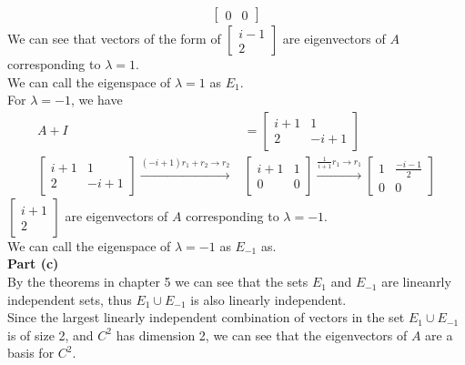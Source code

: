 \documentclass[answers,12pt,addpoints]{exam}
\begin{document}
\begin{questions}
\begin{solution}
\begin{align*}
\begin{bmatrix}
                0 & 0
            \end{bmatrix}
        \end{align*}
        We can see that vectors of the form of $\begin{bmatrix}
            i-1\\
            2
        \end{bmatrix}$ are eigenvectors of $A$ corresponding to $\lambda = 1$.\\
        We can call the eigenspace of $\lambda = 1$ as $E_{1}$.\\
        For $\lambda = -1$, we have
        \begin{align*}
            A + I &= \begin{bmatrix}
                i + 1 & 1 \\
                2 & -i + 1
            \end{bmatrix}\\
            \begin{bmatrix}
                i + 1 & 1 \\
                2 & -i + 1
            \end{bmatrix} \xrightarrow{(-i+1)r_1 + r_2 \to r_2} &\begin{bmatrix}
                i + 1 & 1 \\
                0 & 0
            \end{bmatrix} \xrightarrow{\frac{1}{i+1}r_1 \to r_1} \begin{bmatrix}
                1 & \frac{-i-1}{2} \\
                0 & 0
            \end{bmatrix}
        \end{align*}
        $\begin{bmatrix}
            i+1\\
            2
        \end{bmatrix}$ are eigenvectors of $A$ corresponding to $\lambda = -1$.\\
        We can call the eigenspace of $\lambda = -1$ as $E_{-1}$ as.\\
        \textbf{Part (c)}\\
        By the theorems in chapter 5 we can see that the sets $E_{1}$ and $E_{-1}$ are lineanrly independent sets, thus $E_{1} \cup E_{-1}$ is also linearly independent. \\
        Since the largest linearly independent combination of vectors in the set $E_{1} \cup E_{-1}$ is of size 2, and $C^2$ has dimension 2, we can see that the eigenvectors of $A$ are a basis for $C^2$.\\

\end{solution}
\end{questions}
\end{document}
